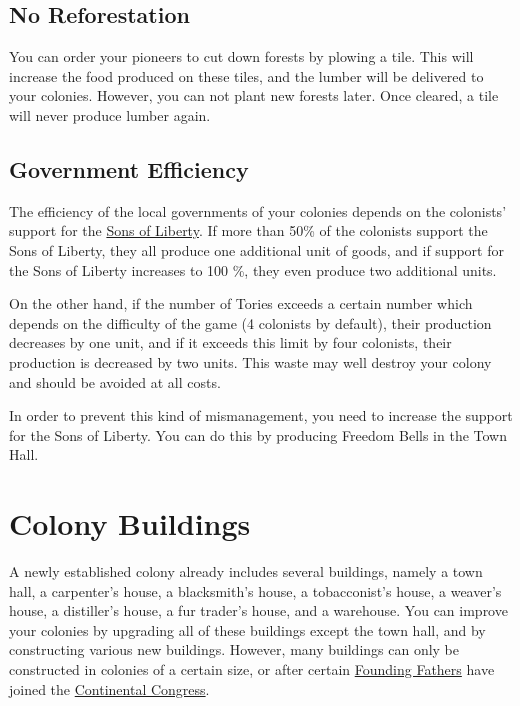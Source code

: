 \documentclass[12pt]{book}
\begin{document}
\hypertarget{No Reforestation}{\subsection{No Reforestation}}

You can order your pioneers to cut down forests by plowing a tile.
This will increase the food produced on these tiles, and the lumber
will be delivered to your colonies. However, you can not plant new
forests later. Once cleared, a tile will never produce lumber again.


\hypertarget{Government Efficiency}{\subsection{Government Efficiency}}

The efficiency of the local governments of your colonies depends on
the colonists' support for the \hyperlink{Sons of Liberty}{Sons of
  Liberty}. If more than 50\% of the colonists support the Sons of
Liberty, they all produce one additional unit of goods, and if support
for the Sons of Liberty increases to 100 \%, they even produce two
additional units.

On the other hand, if the number of Tories exceeds a certain number
which depends on the difficulty of the game (4 colonists by default),
their production decreases by one unit, and if it exceeds this limit
by four colonists, their production is decreased by two units. This
waste may well destroy your colony and should be avoided at all
costs.

In order to prevent this kind of mismanagement, you need to increase
the support for the Sons of Liberty. You can do this by producing
Freedom Bells in the Town Hall.


\hypertarget{Colony Buildings}{\section{Colony Buildings}}

A newly established colony already includes several buildings, namely
a town hall, a carpenter's house, a blacksmith's house, a
tobacconist's house, a weaver's house, a distiller's house, a fur
trader's house, and a warehouse. You can improve your colonies by
upgrading all of these buildings except the town hall, and by
constructing various new buildings. However, many buildings can only
be constructed in colonies of a certain size, or after certain
\hyperlink{Founding Fathers}{Founding Fathers} have joined the
\hyperlink{Continental Congress}{Continental Congress}.
\end{document}
